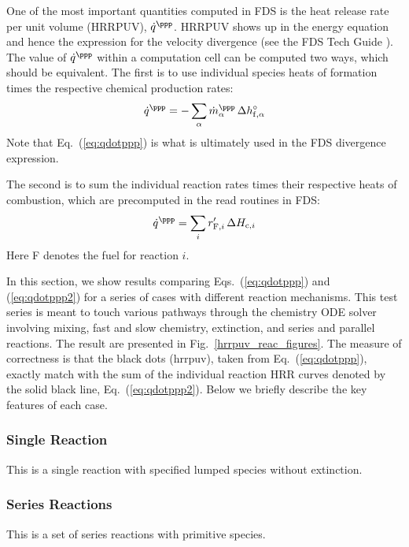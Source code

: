 \documentclass[11pt]{book}
\begin{document}
One of the most important quantities computed in FDS is the heat release rate per unit volume (HRRPUV), $\dot{q}^{\ppp}$.  HRRPUV shows up in the energy equation and hence the expression for the velocity divergence (see the FDS Tech Guide \cite{FDS_Math_Guide}).  The value of $\dot{q}^{\ppp}$ within a computation cell can be computed two ways, which should be equivalent.  The first is to use individual species heats of formation times the respective chemical production rates:
\begin{equation}
\label{eq:qdotppp}
\dot{q}^{\ppp} = - \sum_\alpha \dot{m}_\alpha^{\ppp} \, \Delta h_{{\rm f},\alpha}^\circ
\end{equation}
Note that Eq.~(\ref{eq:qdotppp}) is what is ultimately used in the FDS divergence expression.

The second is to sum the individual reaction rates  times their respective heats of combustion, which are precomputed in the read routines in FDS:
\begin{equation}
\label{eq:qdotppp2}
\dot{q}^{\ppp} = \sum_i r_{{\rm F},i}^\prime \, \Delta H_{{\rm c},i}
\end{equation}
Here F denotes the fuel for reaction $i$.

In this section, we show results comparing Eqs.~(\ref{eq:qdotppp}) and (\ref{eq:qdotppp2}) for a series of cases with different reaction mechanisms.  This test series is meant to touch various pathways through the chemistry ODE solver involving mixing, fast and slow chemistry, extinction, and series and parallel reactions.  The result are presented in Fig.~\ref{hrrpuv_reac_figures}.  The measure of correctness is that the black dots (hrrpuv), taken from Eq.~(\ref{eq:qdotppp}), exactly match with the sum of the individual reaction HRR curves denoted by the solid black line, Eq.~(\ref{eq:qdotppp2}). Below we briefly describe the key features of each case.

\subsubsection{Single Reaction} 

This is a single reaction with specified lumped species without extinction.

\subsubsection{Series Reactions} 

This is a set of series reactions with primitive species.
\end{document}

